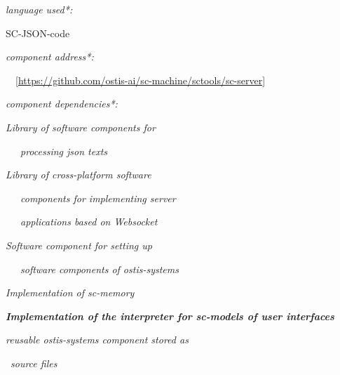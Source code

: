 \documentclass{article}
\begin{document}
\begin{multicols}{2}
\begin{description}[ labelwidth=0.75cm]
\begin{description}[ labelwidth=0.75cm]
\item [$\Rightarrow$] \textit{language used*:}

\begin{description}[ labelwidth=0.75cm]
\item [•] SC-JSON-code
\end{description}

\item [$\Rightarrow$] \textit{component address*:}

\ \ \url{[https://github.com/ostis-ai/sc-machine/sctools/sc-server]}


\item [$\Rightarrow$] \textit{component dependencies*:
}

 \begin{description}[ labelwidth=0.75cm]
 \vspace{-0.15cm}
 \item[\{•] \textit{Library of software components for}\par
 \ \ \  \textit{processing json texts}
\item[\ •] \textit{Library of cross-platform software}\par
 \ \ \  \textit{components for implementing server}\par
 \ \ \  \textit{applications based on Websocket}
 \item[\ •] \textit{Software component for setting up}\par
 \ \ \  \textit{software components of ostis-systems}
  \item[\ •] \textit{Implementation of sc-memory}
\item[\}]
\end{description} 

\end{description}

\noindent\textbf{\textit{Implementation of the interpreter for sc-models of user interfaces}}

\begin{description}[ labelwidth=0.75cm]
\vspace{-0.2cm} 

 \item [:=] [Our proposed interpreter for interpreting \par
 \ \ scmodels of ostis-systems user interfaces]

 \item [$\in$] \textit{reusable ostis-systems component stored as}\par
\ \textit{source files}


\end{description}
\end{description}
\end{multicols}
\end{document}
